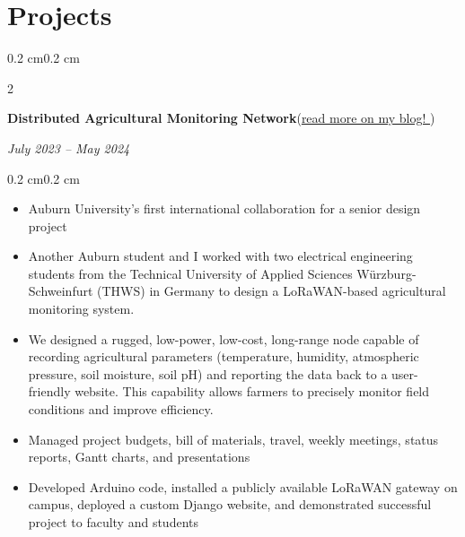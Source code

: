 \documentclass[10pt, letterpaper]{article}
\newenvironment{highlights}{
    \begin{itemize}[topsep=0.10 cm,parsep=0.10 cm,partopsep=0pt,itemsep=0pt,leftmargin=0.4 cm + 10pt]
}{
    \end{itemize}
}
\newenvironment{onecolentry}{
    \begin{adjustwidth}{0.2 cm}{0.2 cm}
}{
    \end{adjustwidth}
}
\newenvironment{twocolentry}[2][]{
    \onecolentry
    \def\secondColumn{#2}
    \setcolumnwidth{\fill, 4.5 cm}
    \begin{paracol}{2}
}{
    \switchcolumn \raggedleft \secondColumn
    \end{paracol}
    \endonecolentry
}
\let\hrefWithoutArrow\href
\renewcommand{\href}[2]{\hrefWithoutArrow{#1}{#2 \raisebox{.15ex}{\footnotesize \faExternalLink*}}}
\begin{document}
    \section{Projects}
        \begin{twocolentry}{\textit{July 2023 – May 2024}}
            \textbf{Distributed Agricultural Monitoring Network}(\href{https://elijahparker000.com/blog/2024/DNAM-Conclusion/}{read more on my blog!})
        \end{twocolentry}
        \vspace{0.10 cm}
        \begin{onecolentry}
            \begin{highlights}
                \item Auburn University's first international collaboration for a senior design project
                \item Another Auburn student and I worked with two electrical engineering students from the Technical University of Applied Sciences Würzburg-Schweinfurt (THWS) in Germany to design a LoRaWAN-based agricultural monitoring system.
                \item We designed a rugged, low-power, low-cost, long-range node capable of recording agricultural parameters (temperature, humidity, atmospheric pressure, soil moisture, soil pH) and reporting the data back to a user-friendly website. This capability allows farmers to precisely monitor field conditions and improve efficiency. 
                \item Managed project budgets, bill of materials, travel, weekly meetings, status reports, Gantt charts, and presentations
                \item Developed Arduino code, installed a publicly available LoRaWAN gateway on campus, deployed a custom Django website, and demonstrated successful project to faculty and students
            \end{highlights}
        \end{onecolentry}

        \vspace{0.2 cm}
\end{document}
